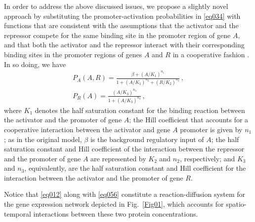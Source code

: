 \documentclass[11pt]{article}
\begin{document}
	In order to address the above discussed issues, we propose a slightly novel approach by
	substituting the promoter-activation probabilities in \eqref{eq034} with functions that are consistent
	with the assumptions that the activator and the repressor compete for
	the same binding site in the promoter region of gene $A$, and that both the
	activator and the repressor interact with their corresponding binding sites in
	the promoter regions of genes $A$ and $R$ in a cooperative fashion
	\citep{Santillan2008b}. In so doing, we have
	\begin{subequations}\label{eq056}
		\begin{gather}
		P_A(A,R) = \displaystyle \frac{\beta + (A/K_1)^{n_1}}{1 + (A/K_1)^{n_2} +
			(R/K_2)^{n_2}}\,, \label{eq05} \\[3mm]
		P_R(A)  = \displaystyle \frac{(A/K_3)^{n_3}}{1 + (A/K_3)^{n_3}}\,,
		\label{eq06}
		\end{gather}
	\end{subequations}
	where $K_1$ denotes the half saturation constant for the binding reaction
	between the activator and the promoter of gene $A$; the Hill coefficient that
	accounts for a cooperative interaction between the activator and gene $A$
	promoter is given by $n_1$; as in the original model, $\beta$ is the background
	regulatory input of $A$; the half saturation constant and Hill coefficient of
	the interaction between the repressor and the promoter of gene $A$ are
	represented by $K_2$ and $n_2$, respectively; and $K_3$ and $n_3$, equivalently,
	are the half saturation constant and Hill coefficient for the interaction
	between the activator and the promoter of gene $R$. 
	
	Notice that \eqref{eq012} along with \eqref{eq056} constitute a
	reaction-diffusion system for the gene expression network depicted in
	Fig.~\ref{Fig01}, which accounts for spatio-temporal interactions between these
	two protein concentrations.
	
\end{document}
